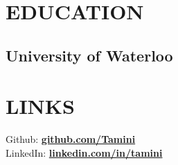 \documentclass[letterpaper]{deedy-resume-modified} %
\begin{document}


\hspace{-25pt}\colorbox{MidnightBlue!60}{\hspace{15pt}
\begin{minipage}[t]{0.32\textwidth} %
\vspace{16pt}

\section*{\color{White}EDUCATION} 

\subsection{University of Waterloo}


\sectionspace %


\section*{\color{White}LINKS} 

Github: \href{https://github.com/Tamini}{\bf github.com/Tamini} \\
LinkedIn: \href{https://www.linkedin.com/in/tamini}{\bf linkedin.com/in/tamini} \\

\sectionspace %



\end{minipage}}
\end{document}
